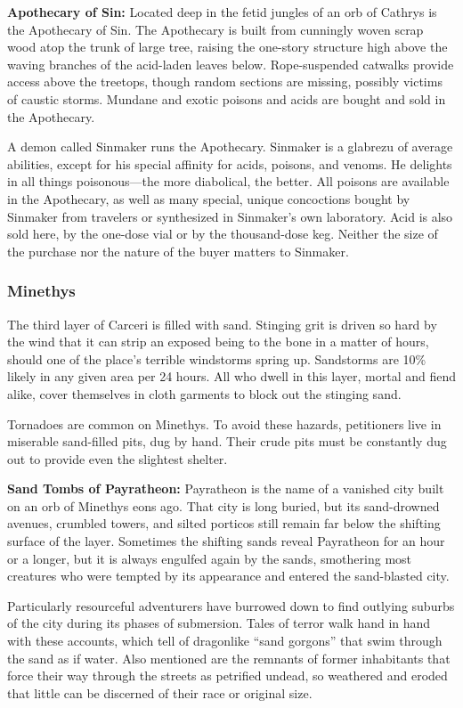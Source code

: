 \textbf{Apothecary of Sin:} Located deep in the fetid jungles of an orb of Cathrys is the Apothecary of Sin. The Apothecary is built from cunningly woven scrap wood atop the trunk of large tree, raising the one-story structure high above the waving branches of the acid-laden leaves below. Rope-suspended catwalks provide access above the treetops, though random sections are missing, possibly victims of caustic storms. Mundane and exotic poisons and acids are bought and sold in the Apothecary.

A demon called Sinmaker runs the Apothecary. Sinmaker is a glabrezu of average abilities, except for his special affinity for acids, poisons, and venoms. He delights in all things poisonous---the more diabolical, the better. All poisons are available in the Apothecary, as well as many special, unique concoctions bought by Sinmaker from travelers or synthesized in Sinmaker's own laboratory. Acid is also sold here, by the one-dose vial or by the thousand-dose keg. Neither the size of the purchase nor the nature of the buyer matters to Sinmaker.

\subsubsection{Minethys}
The third layer of Carceri is filled with sand. Stinging grit is driven so hard by the wind that it can strip an exposed being to the bone in a matter of hours, should one of the place's terrible windstorms spring up. Sandstorms are 10\% likely in any given area per 24 hours. All who dwell in this layer, mortal and fiend alike, cover themselves in cloth garments to block out the stinging sand.

Tornadoes are common on Minethys. To avoid these hazards, petitioners live in miserable sand-filled pits, dug by hand. Their crude pits must be constantly dug out to provide even the slightest shelter.

\textbf{Sand Tombs of Payratheon:} Payratheon is the name of a vanished city built on an orb of Minethys eons ago. That city is long buried, but its sand-drowned avenues, crumbled towers, and silted porticos still remain far below the shifting surface of the layer. Sometimes the shifting sands reveal Payratheon for an hour or a longer, but it is always engulfed again by the sands, smothering most creatures who were tempted by its appearance and entered the sand-blasted city.

Particularly resourceful adventurers have burrowed down to find outlying suburbs of the city during its phases of submersion. Tales of terror walk hand in hand with these accounts, which tell of dragonlike ``sand gorgons'' that swim through the sand as if water. Also mentioned are the remnants of former inhabitants that force their way through the streets as petrified undead, so weathered and eroded that little can be discerned of their race or original size.

